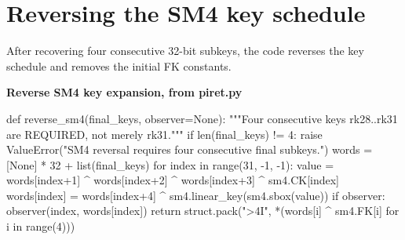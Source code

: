\section{Reversing the SM4 key schedule}
After recovering four consecutive 32-bit subkeys, the code reverses the key schedule and removes the initial FK constants.
\par\smallskip\noindent\textbf{Reverse SM4 key expansion, from piret.py}\par
\begin{lightcode}
def reverse_sm4(final_keys, observer=None):
    """Four consecutive keys rk28..rk31 are REQUIRED, not merely rk31."""
    if len(final_keys) != 4:
        raise ValueError("SM4 reversal requires four consecutive final subkeys.")
    words = [None] * 32 + list(final_keys)
    for index in range(31, -1, -1):
        value = words[index+1] ^ words[index+2] ^ words[index+3] ^ sm4.CK[index]
        words[index] = words[index+4] ^ sm4.linear_key(sm4.sbox(value))
        if observer:
            observer(index, words[index])
    return struct.pack(">4I", *(words[i] ^ sm4.FK[i] for i in range(4)))
\end{lightcode}

